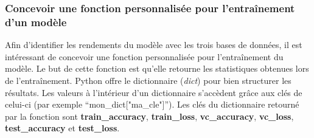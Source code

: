 \documentclass{article}
\begin{document}
\subsubsection{Concevoir une fonction personnalisée pour l'entraînement d'un modèle}
Afin d'identifier les rendements du modèle avec les trois bases de données, il est intéressant de concevoir une fonction personnalisée pour l'entraînement du modèle. Le but de cette fonction est qu'elle retourne les statistiques obtenues lors de l'entraînement. Python offre le dictionnaire (\textit{dict}) pour bien structurer les résultats. Les valeurs à l'intérieur d'un dictionnaire s'accèdent grâce aux clés de celui-ci (par exemple ``mon\_dict["ma\_cle"]''). Les clés du dictionnaire retourné par la fonction sont \textbf{train\_accuracy}, \textbf{train\_loss}, \textbf{vc\_accuracy}, \textbf{vc\_loss}, \textbf{test\_accuracy} et \textbf{test\_loss}.
\end{document}
